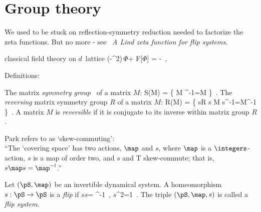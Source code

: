 
\renewcommand{\Refl}{\ensuremath{{s}}} %
\renewcommand{\shift}{\ensuremath{r}}
\renewcommand{\ssp}{\ensuremath{\phi}}             %
\renewcommand{\Xx}{\ensuremath{\mathsf{\Phi}}}      %
\renewcommand{\Ssym}[1]{{\ensuremath{m_{#1}}}}    %


\chapter{Group theory}
\label{chap:groups}

                                                                \toCB
We used to be stuck on reflection-symmetry reduction needed to factorize the
zeta functions. But no more - see
~{\em A Lind zeta function for flip systems}.


classical field theory on $d$\dmn\ lattice
\beq
 (\Box -\mu^2)\,\Xx + F[\Xx] =  -\Mm
 \,,

\bigskip

Definitions:

\noindent
The matrix \emph{symmetry group} \Group\ of a matrix $M$:
\beq
{\cal S}(M) =   \{
             \LieEl\in\Group \mid \LieEl M \LieEl^{-1}=M
                \}
\,.
The \emph{reversing} matrix symmetry group $R$ of a matrix $M$:
\beq
{\cal R}(M) =  \{
             s\in R \mid s M s^{-1}=M^{-1}
               \}
\,.
A matrix $M$ is \emph{reversible} if
it is conjugate to its inverse within matrix group $R$.

Park refers to  as `skew-commuting':\\
``The `covering space' has two actions, $\map$ and $\Refl$, where $\map$ is
a $\integers$-action, $\Refl$ is a map of order two, and $\Refl$ and T
skew-commute; that is, $\Refl\map\Refl = \map^{-l}$.''

Let $(\pS,\map)$ be an invertible dynamical system. A homeomorphism
$\Refl:\pS \rightarrow \pS$ is a \textit{flip} if
\beq
\Refl\circ\map\circ\Refl = \map^{-1}
\,,\qquad
\Refl^2=1
\,.
The triple $(\pS,\map,\Refl)$ is called a \textit{flip system}.

